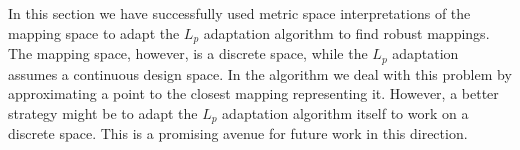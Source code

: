 In this section we have successfully used metric space interpretations of the mapping space to adapt the $L_p$ adaptation algorithm to find robust mappings.
The mapping space, however, is a discrete space, while the $L_p$ adaptation assumes a continuous design space.
In the algorithm we deal with this problem by approximating a point to the closest mapping representing it.
However, a better strategy might be to adapt the $L_p$ adaptation algorithm itself to work on a discrete space.
This is a promising avenue for future work in this direction.